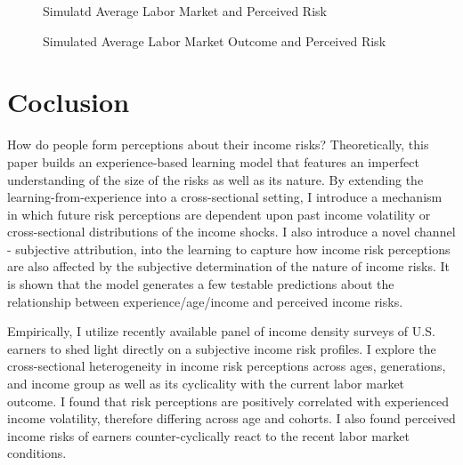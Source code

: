 \documentclass[12pt,notitlepage,onecolumn,aps,pra]{article}
\begin{document}
    \begin{figure*}[!ht]
        \begin{center}\end{center}
        \caption{Simulatd Average Labor Market and Perceived Risk}
        \label{fig:recent_change_var_sim1}
    \end{figure*}
    

    \begin{figure*}[!ht]
        \begin{center}\end{center}
        \caption{Simulated Average Labor Market Outcome and Perceived Risk}
        \label{fig:recent_change_var_sim2}
    \end{figure*}
    
    \hypertarget{coclusion}{%
\section{Coclusion}\label{coclusion}}

How do people form perceptions about their income risks? Theoretically,
this paper builds an experience-based learning model that features an
imperfect understanding of the size of the risks as well as its nature.
By extending the learning-from-experience into a cross-sectional
setting, I introduce a mechanism in which future risk perceptions are
dependent upon past income volatility or cross-sectional distributions
of the income shocks. I also introduce a novel channel - subjective
attribution, into the learning to capture how income risk perceptions
are also affected by the subjective determination of the nature of
income risks. It is shown that the model generates a few testable
predictions about the relationship between experience/age/income and
perceived income risks.

Empirically, I utilize recently available panel of income density
surveys of U.S. earners to shed light directly on a subjective income
risk profiles. I explore the cross-sectional heterogeneity in income
risk perceptions across ages, generations, and income group as well as
its cyclicality with the current labor market outcome. I found that risk
perceptions are positively correlated with experienced income
volatility, therefore differing across age and cohorts. I also found
perceived income risks of earners counter-cyclically react to the recent
labor market conditions.
\end{document}
